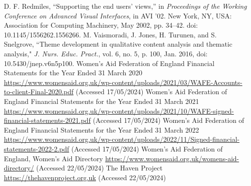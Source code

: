 \documentclass[conference]{IEEEtran}
\begin{document}
\begin{thebibliography}{00}
 D. F. Redmiles, “Supporting the end users’ views,” in \textit{Proceedings of the Working Conference on Advanced Visual Interfaces}, in AVI ’02. New York, NY, USA: Association for Computing Machinery, May 2002, pp. 34–42. doi: 10.1145/1556262.1556266.
 M. Vaismoradi, J. Jones, H. Turunen, and S. Snelgrove, ``Theme development in qualitative content analysis and thematic analysis," \textit{J. Nurs. Educ. Pract.}, vol. 6, no. 5, p. 100, Jan. 2016, doi: 10.5430/jnep.v6n5p100.
 Women's Aid Federation of England Financial Statements for the Year Ended 31 March 2020 \url{https://www.womensaid.org.uk/wp-content/uploads/2021/03/WAFE-Accounts-to-client-Final-2020.pdf} (Accessed 17/05/2024)
 Women's Aid Federation of England Financial Statements for the Year Ended 31 March 2021 \url{https://www.womensaid.org.uk/wp-content/uploads/2021/10/WAFE-signed-financial-statements-2021.pdf} (Accessed 17/05/2024)
 Women's Aid Federation of England Financial Statements for the Year Ended 31 March 2022 \url{https://www.womensaid.org.uk/wp-content/uploads/2022/11/Signed-financial-statements-2022-2.pdf} (Accessed 17/05/2024)
 Women's Aid Federation of England, Women's Aid Directory \url{https://www.womensaid.org.uk/womens-aid-directory/} (Accessed 22/05/2024)
 The Haven Project \url{https://thehavenproject.org.uk} (Accessed 22/05/2024)
\end{thebibliography}
\end{document}
